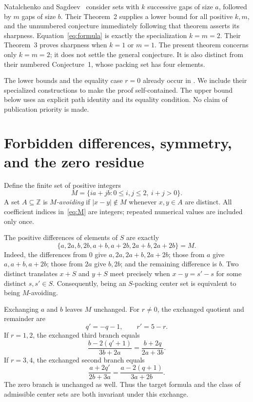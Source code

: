 \documentclass[11pt]{article}
\theoremstyle{remark}
\newcommand{\Z}{\mathbb Z}
\begin{document}
Natalchenko and Sagdeev~\cite{NS} consider sets with \(k\) successive
gaps of size \(a\), followed by \(m\) gaps of size \(b\). Their
Theorem~2 supplies a lower bound for all positive \(k,m\), and the
unnumbered conjecture immediately following that theorem asserts its
sharpness. Equation~\eqref{eq:formula} is exactly the specialization
\(k=m=2\). Their Theorem~3 proves sharpness when \(k=1\) or \(m=1\).
The present theorem concerns only \(k=m=2\); it does not settle the
general conjecture. It is also distinct from their numbered
Conjecture~1, whose packing set has four elements.

The lower bounds and the equality case \(r=0\) already occur in
\cite[Theorem~2 and Section~2]{NS}. We include their specialized
constructions to make the proof self-contained. The upper bound below
uses an explicit path identity and its equality condition. No claim of
publication priority is made.

\section{Forbidden differences, symmetry, and the zero residue}

Define the finite set of positive integers
\begin{equation}\label{eq:M}
 M=\{ia+jb:0\le i,j\le2,\ i+j>0\}.
\end{equation}
A set \(A\subseteq\Z\) is \emph{\(M\)-avoiding} if
\(|x-y|\notin M\) whenever \(x,y\in A\) are distinct.
All coefficient indices in~\eqref{eq:M} are integers; repeated
numerical values are included only once.

The positive differences of elements of \(S\) are exactly
\[
 \{a,2a,b,2b,a+b,a+2b,2a+b,2a+2b\}=M.
\]
Indeed, the differences from \(0\) give
\(a,2a,2a+b,2a+2b\); those from \(a\) give
\(a,a+b,a+2b\); those from \(2a\) give \(b,2b\); and the
remaining difference is \(b\). Two distinct translates \(x+S\) and
\(y+S\) meet precisely when \(x-y=s'-s\) for some distinct
\(s,s'\in S\). Consequently, being an \(S\)-packing center set is
equivalent to being \(M\)-avoiding.

Exchanging \(a\) and \(b\) leaves \(M\) unchanged. For \(r\ne0\),
the exchanged quotient and remainder are
\begin{equation}\label{eq:swap}
 q'=-q-1,\qquad r'=5-r.
\end{equation}
If \(r=1,2\), the exchanged third branch equals
\[
 \frac{b-2(q'+1)}{3b+2a}=\frac{b+2q}{2a+3b}.
\]
If \(r=3,4\), the exchanged second branch equals
\[
 \frac{a+2q'}{2b+3a}=\frac{a-2(q+1)}{3a+2b}.
\]
The zero branch is unchanged as well. Thus the target formula and the
class of admissible center sets are both invariant under this exchange.
\end{document}
